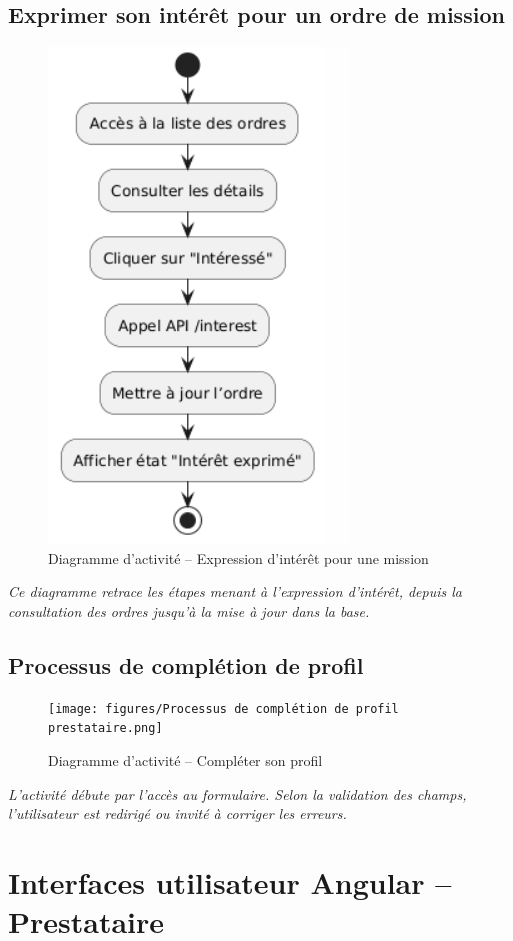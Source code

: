 \subsection*{Exprimer son intérêt pour un ordre de mission}
\begin{figure}[H]
\centering
\includegraphics[width=0.60\linewidth]{figures/Exprimer son intérêt pour un ordre de mission act.png}
\caption{Diagramme d’activité – Expression d’intérêt pour une mission}
\end{figure}
\textit{Ce diagramme retrace les étapes menant à l’expression d’intérêt, depuis la consultation des ordres jusqu’à la mise à jour dans la base.}

\subsection*{Processus de complétion de profil}
\begin{figure}[H]
\centering
\texttt{[image: figures/Processus de complétion de profil prestataire.png]}
\caption{Diagramme d’activité – Compléter son profil}
\end{figure}
\textit{L’activité débute par l’accès au formulaire. Selon la validation des champs, l'utilisateur est redirigé ou invité à corriger les erreurs.}

\section*{Interfaces utilisateur Angular – Prestataire}

